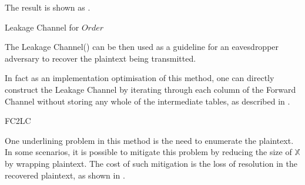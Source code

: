 \begin{example}
The result is shown as .

\begin{table}[H]
\begin{center}
{}
\end{center}
\caption{Leakage Channel for $Order$}
\label{Tbl: Leakage Channel for Order}
\end{table}

The Leakage Channel() can be then used as a guideline for an eavesdropper adversary to recover the plaintext being transmitted.

In fact as an implementation optimisation of this method, one can directly construct the Leakage Channel by iterating through each column of the Forward Channel without storing any whole of the intermediate tables, as described in .

\begin{algorithm}[H]
 \caption{FC2LC} \label{Alg: FC2LC}
\end{algorithm}

\end{example}

One underlining problem in this method is the need to enumerate the plaintext. In some scenarios, it is possible to mitigate this problem by reducing the size of $\mathbb{X}$ by wrapping plaintext. The cost of such mitigation is the loss of resolution in the recovered plaintext, as shown in .

